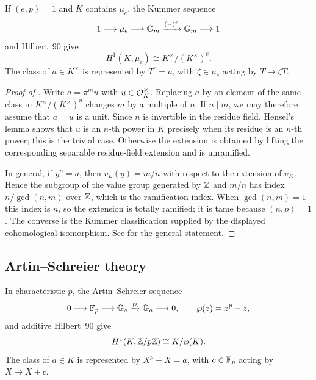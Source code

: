 If $(e,p)=1$ and $K$ contains $\mu_e$, the Kummer sequence
\[
1\longrightarrow\mu_e\longrightarrow\mathbb{G}_m
\xrightarrow{(-)^e}\mathbb{G}_m\longrightarrow1
\]
and Hilbert~90 give
\[
H^1(K,\mu_e)\cong K^\times/(K^\times)^e.
\]
The class of $a\in K^\times$ is represented by $T^e=a$, with
$\zeta\in\mu_e$ acting by $T\mapsto\zeta T$.

\begin{proof}[Proof of ]
Write $a=\pi^m u$ with $u\in\mathcal{O}_K^\times$. Replacing $a$ by an element of
the same class in $K^\times/(K^\times)^n$ changes $m$ by a multiple of $n$.
If $n\mid m$, we may therefore assume that $a=u$ is a unit. Since $n$ is
invertible in the residue field, Hensel's lemma shows that $u$ is an $n$-th
power in $K$ precisely when its residue is an $n$-th power; this is the
trivial case. Otherwise the extension is obtained by lifting the corresponding
separable residue-field extension and is unramified.

In general, if $y^n=a$, then $v_L(y)=m/n$ with respect to the extension of
$v_K$. Hence the subgroup of the value group generated by $\mathbb{Z}$ and $m/n$ has
index $n/\gcd(n,m)$ over $\mathbb{Z}$, which is the ramification index. When
$\gcd(n,m)=1$ this index is $n$, so the extension is totally ramified; it is
tame because $(n,p)=1$. The converse is the Kummer classification supplied by
the displayed cohomological isomorphism. See
\cite[Proposition~1.83]{koch1997algebraic} for the general statement.
\end{proof}

\subsection{Artin--Schreier theory}

In characteristic $p$, the Artin--Schreier sequence
\[
0\longrightarrow\mathbb{F}_p\longrightarrow\mathbb{G}_a
\xrightarrow{\wp}\mathbb{G}_a\longrightarrow0,
\qquad \wp(z)=z^p-z,
\]
and additive Hilbert~90 give
\[
H^1(K,\mathbb{Z}/p\mathbb{Z})\cong K/\wp(K).
\]
The class of $a\in K$ is represented by $X^p-X=a$, with
$c\in\mathbb{F}_p$ acting by $X\mapsto X+c$.

